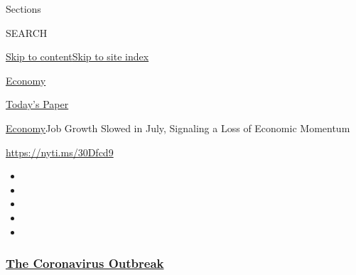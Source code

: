 Sections

SEARCH

\protect\hyperlink{site-content}{Skip to
content}\protect\hyperlink{site-index}{Skip to site index}

\href{https://www.nytimes3xbfgragh.onion/section/business/economy}{Economy}

\href{https://myaccount.nytimes3xbfgragh.onion/auth/login?response_type=cookie\&client_id=vi}{}

\href{https://www.nytimes3xbfgragh.onion/section/todayspaper}{Today's
Paper}

\href{/section/business/economy}{Economy}\textbar{}Job Growth Slowed in
July, Signaling a Loss of Economic Momentum

\url{https://nyti.ms/30Dfcd9}

\begin{itemize}
\item
\item
\item
\item
\item
\end{itemize}

\hypertarget{the-coronavirus-outbreak}{%
\subsubsection{\texorpdfstring{\href{https://www.nytimes3xbfgragh.onion/news-event/coronavirus?name=styln-coronavirus-markets\&region=TOP_BANNER\&variant=undefined\&block=storyline_menu_recirc\&action=click\&pgtype=Article\&impression_id=a4f4e500-e3b5-11ea-82f7-af6d488d7008}{The
Coronavirus
Outbreak}}{The Coronavirus Outbreak}}\label{the-coronavirus-outbreak}}

